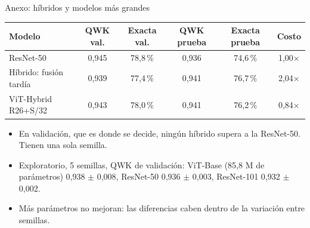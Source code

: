 \documentclass[aspectratio=169,11pt,table]{beamer}
\begin{document}
\begin{frame}{Anexo: híbridos y modelos más grandes}\relax
{\footnotesize
\centering
\begin{tabular}{lccccc}
\toprule
\rowcolor{verdeosc}\color{white}\bfseries Modelo & \color{white}\bfseries QWK val. & \color{white}\bfseries Exacta val. & \color{white}\bfseries QWK prueba & \color{white}\bfseries Exacta prueba & \color{white}\bfseries Costo \\
\midrule
ResNet-50 & 0{,}945 & 78{,}8\,\% & 0{,}936 & 74{,}6\,\% & 1{,}00$\times$ \\
Híbrido: fusión tardía & 0{,}939 & 77{,}4\,\% & 0{,}941 & 76{,}7\,\% & 2{,}04$\times$ \\
ViT-Hybrid R26+S/32 & 0{,}943 & 78{,}0\,\% & 0{,}941 & 76{,}2\,\% & 0{,}84$\times$ \\
\bottomrule
\end{tabular}
}
\vspace{0.6em}
{\small
\setlength{\itemsep}{0.3em}
\begin{itemize}
  \item En validación, que es donde se decide, ningún híbrido supera a la ResNet-50. Tienen una sola semilla.
  \item Exploratorio, 5 semillas, QWK de validación: ViT-Base (85,8 M de parámetros) 0{,}938 $\pm$ 0{,}008, ResNet-50 0{,}936 $\pm$ 0{,}003, ResNet-101 0{,}932 $\pm$ 0{,}002.
  \item Más parámetros no mejoran: las diferencias caben dentro de la variación entre semillas.
\end{itemize}
}
\end{frame}
\end{document}
